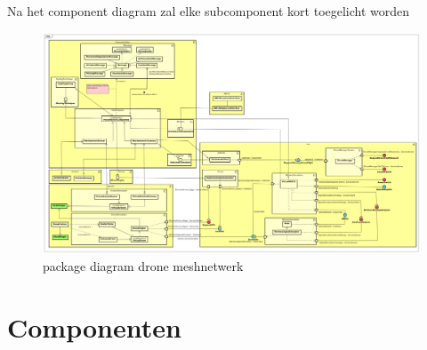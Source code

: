 \documentclass[a4paper, 11pt, oneside]{report}
\begin{document}
Na het component diagram zal elke subcomponent kort toegelicht worden


\begin{landscape}
	\begin{figure}[p]%
		\includegraphics[width=\linewidth]{Afbeeldingen/ComponentDiagram.png}%
		\caption{package diagram drone meshnetwerk}
			\label{fig:packagediagram}
	\end{figure}%
\clearpage
\end{landscape}
\clearpage



\section{Componenten}
\label{architectural:subcomponenten}
\end{document}
